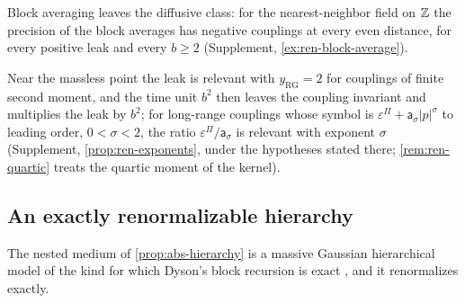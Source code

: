 Block averaging leaves the diffusive class: for the nearest-neighbor field on $\mathbb{Z}$ the precision of the block averages has negative couplings at every even distance, for every positive leak and every $b\ge2$ (Supplement, \cref{ex:ren-block-average}).

Near the massless point the leak is relevant with $y_{\mathrm{RG}}=2$ for couplings of finite second moment, and the time unit $b^2$ then leaves the coupling invariant and multiplies the leak by $b^2$; for long-range couplings whose symbol is $\varepsilon^\Pi+\mathsf a_\sigma\lvert p\rvert^\sigma$ to leading order, $0<\sigma<2$, the ratio $\varepsilon^\Pi/\mathsf a_\sigma$ is relevant with exponent $\sigma$ (Supplement, \cref{prop:ren-exponents}, under the hypotheses stated there; \cref{rem:ren-quartic} treats the quartic moment of the kernel).

\subsection{An exactly renormalizable hierarchy}\label{sec:ren-nested}

The nested medium of \cref{prop:abs-hierarchy} is a massive Gaussian hierarchical model of the kind for which Dyson's block recursion is exact \citep{dyson1969existence,jonalasinio2001renormalization}, and it renormalizes exactly.

